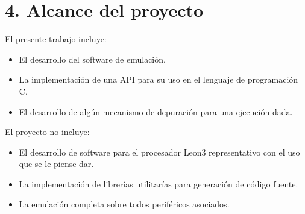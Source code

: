 \section{4. Alcance del proyecto}
\label{sec:alcance}

El presente trabajo incluye:

\begin{itemize}
\item El desarrollo del software de emulación.
\item La implementación de una API para su uso en el lenguaje de programación C.
\item El desarrollo de algún mecanismo de depuración para una ejecución dada.
\end{itemize}

El proyecto no incluye:

\begin{itemize}
\item El desarrollo de software para el procesador Leon3 representativo con el uso que se le piense dar.
\item La implementación de librerías utilitarías para generación de código fuente.
\item La emulación completa sobre todos periféricos asociados.
\end{itemize}


